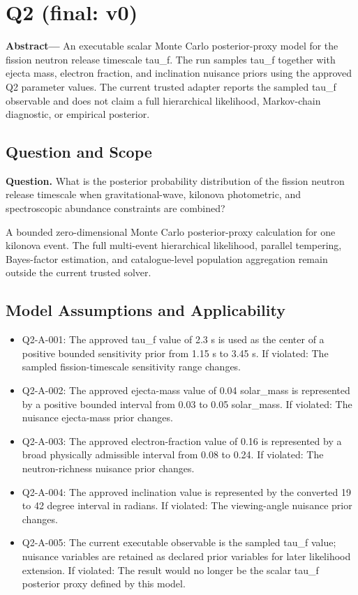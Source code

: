 \documentclass[11pt]{article}
\begin{document}
\section{Q2 (final: v0)}

\noindent\textbf{Abstract—} An executable scalar Monte Carlo posterior-proxy model for the fission neutron release timescale tau\_f. The run samples tau\_f together with ejecta mass, electron fraction, and inclination nuisance priors using the approved Q2 parameter values. The current trusted adapter reports the sampled tau\_f observable and does not claim a full hierarchical likelihood, Markov-chain diagnostic, or empirical posterior.

\subsection{Question and Scope}

\noindent\textbf{Question.} What is the posterior probability distribution of the fission neutron release timescale when gravitational-wave, kilonova photometric, and spectroscopic abundance constraints are combined?



A bounded zero-dimensional Monte Carlo posterior-proxy calculation for one kilonova event. The full multi-event hierarchical likelihood, parallel tempering, Bayes-factor estimation, and catalogue-level population aggregation remain outside the current trusted solver.

\subsection{Model Assumptions and Applicability}

\begin{itemize}\raggedright
\item Q2-A-001: The approved tau\_\allowbreak{}f value of 2.3 s is used as the center of a positive bounded sensitivity prior from 1.15 s to 3.45 s. If violated: The sampled fission-timescale sensitivity range changes.
\item Q2-A-002: The approved ejecta-mass value of 0.04 solar\_\allowbreak{}mass is represented by a positive bounded interval from 0.03 to 0.05 solar\_\allowbreak{}mass. If violated: The nuisance ejecta-mass prior changes.
\item Q2-A-003: The approved electron-fraction value of 0.16 is represented by a broad physically admissible interval from 0.08 to 0.24. If violated: The neutron-richness nuisance prior changes.
\item Q2-A-004: The approved inclination value is represented by the converted 19 to 42 degree interval in radians. If violated: The viewing-angle nuisance prior changes.
\item Q2-A-005: The current executable observable is the sampled tau\_\allowbreak{}f value; nuisance variables are retained as declared prior variables for later likelihood extension. If violated: The result would no longer be the scalar tau\_\allowbreak{}f posterior proxy defined by this model.
\end{itemize}
\end{document}

